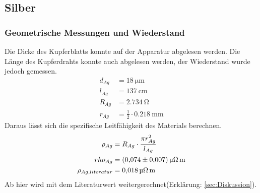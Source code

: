 \subsection{Silber}
\subsubsection{Geometrische Messungen und Wiederstand}
Die Dicke des Kupferblatts konnte auf der Apparatur abgelesen werden.
Die Länge des Kupferdrahts konnte auch abgelesen werden, der Wiederstand wurde jedoch gemessen.
\begin{align*}
    d_{Ag} &= \SI{18}{\micro \meter} \\
    l_{Ag} &= \SI{137}{\centi \meter}\\
    R_{Ag} &= \SI{2,734}{\ohm}\\
    r_{Ag} &= \frac{1}{2}\cdot \SI{0,218}{\milli \meter}
\end{align*}
Daraus lässt sich die spezifische Leitfähigkeit des Materials berechnen.
\begin{align*}
    \rho_{Ag} &= R_{Ag}\cdot \frac{\pi r_{Ag}^2}{l_{Ag}}\\
    rho_{Ag} &= \SI{0,074\pm0,007}{\micro \ohm \meter}\\
    \rho_{Ag,literatur} &= \SI{0,018}{\micro \ohm \meter} %
\end{align*}
Ab hier wird mit dem Literaturwert weitergerechnet(Erklärung: \ref{sec:Diskussion}).
